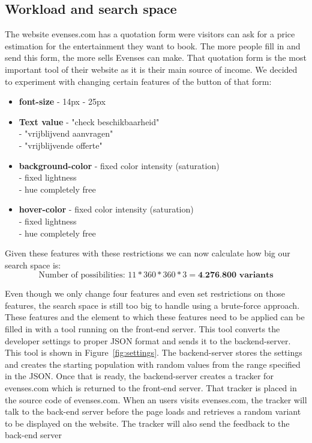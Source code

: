 \documentclass{report}
\newcommand\tab[1][1cm]{\hspace*{#1}}
\begin{document}
\subsection{Workload and search space}
The website evenses.com has a quotation form were visitors can ask for a price estimation for the entertainment they want to book. The more people fill in and send this form, the more sells Evenses can make. That quotation form is the most important tool of their website as it is their main source of income. We decided to experiment with changing certain features of the button of that form:
\begin{itemize}
	\item \textbf{font-size} - 14px - 25px
	\item \textbf{Text value} - "check beschikbaarheid"\\\tab[1.85cm] - "vrijblijvend aanvragen"\\\tab[1.85cm] - "vrijblijvende offerte"
	\item \textbf{background-color} - fixed color intensity (saturation)\\\tab[3.05cm] - fixed lightness\\\tab[3.05cm] - hue completely free
	\item \textbf{hover-color} - fixed color intensity (saturation)\\\tab[1.97cm] - fixed lightness\\\tab[1.97cm] - hue completely free
\end{itemize}

Given these features with these restrictions we can now calculate how big our search space is:
$$\text{Number of possibilities: } 11*360*360*3 = \textbf{4.276.800 variants}$$

Even though we only change four features and even set restrictions on those features, the search space is still too big to handle using a brute-force approach.\\

These features and the element to which these features need to be applied can be filled in with a tool running on the front-end server. This tool converts the developer settings to proper JSON format and sends it to the backend-server. This tool is shown in Figure~\ref{fig:settings}. The backend-server stores the settings and creates the starting population with random values from the range specified in the JSON. Once that is ready, the backend-server creates a tracker for evenses.com which is returned to the front-end server. That tracker is placed in the source code of evenses.com. When an users visits evenses.com, the tracker will talk to the back-end server before the page loads and retrieves a random variant to be displayed on the website. The tracker will also send the feedback to the back-end server
\end{document}
